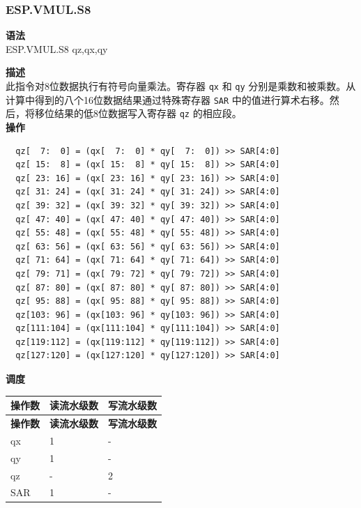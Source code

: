\newpage
\subsubsection{ESP.VMUL.S8}\label{instruction:ESPVMULS8}
\textbf{语法}\\
ESP.VMUL.S8 qz,qx,qy

\textbf{描述}\\
此指令对8位数据执行有符号向量乘法。寄存器 \lstinline{qx} 和 \lstinline{qy} 分别是乘数和被乘数。从计算中得到的八个16位数据结果通过特殊寄存器 \lstinline{SAR} 中的值进行算术右移。然后，将移位结果的低8位数据写入寄存器 \lstinline{qz} 的相应段。\\
\textbf{操作}
\begin{lstlisting}
  qz[  7:  0] = (qx[  7:  0] * qy[  7:  0]) >> SAR[4:0]
  qz[ 15:  8] = (qx[ 15:  8] * qy[ 15:  8]) >> SAR[4:0]
  qz[ 23: 16] = (qx[ 23: 16] * qy[ 23: 16]) >> SAR[4:0]
  qz[ 31: 24] = (qx[ 31: 24] * qy[ 31: 24]) >> SAR[4:0]
  qz[ 39: 32] = (qx[ 39: 32] * qy[ 39: 32]) >> SAR[4:0]
  qz[ 47: 40] = (qx[ 47: 40] * qy[ 47: 40]) >> SAR[4:0]
  qz[ 55: 48] = (qx[ 55: 48] * qy[ 55: 48]) >> SAR[4:0]
  qz[ 63: 56] = (qx[ 63: 56] * qy[ 63: 56]) >> SAR[4:0]
  qz[ 71: 64] = (qx[ 71: 64] * qy[ 71: 64]) >> SAR[4:0]
  qz[ 79: 71] = (qx[ 79: 72] * qy[ 79: 72]) >> SAR[4:0]
  qz[ 87: 80] = (qx[ 87: 80] * qy[ 87: 80]) >> SAR[4:0]
  qz[ 95: 88] = (qx[ 95: 88] * qy[ 95: 88]) >> SAR[4:0]
  qz[103: 96] = (qx[103: 96] * qy[103: 96]) >> SAR[4:0]
  qz[111:104] = (qx[111:104] * qy[111:104]) >> SAR[4:0]
  qz[119:112] = (qx[119:112] * qy[119:112]) >> SAR[4:0]
  qz[127:120] = (qx[127:120] * qy[127:120]) >> SAR[4:0]

\end{lstlisting}


\textbf{调度}\\
\begin{longtable}[c]{|l|l|l|}
    \hline
    \rowcolor{lightgray}
    \textbf{操作数} & \textbf{读流水级数} & \textbf{写流水级数} \\\hline
    \endfirsthead
    \hline
    \rowcolor{lightgray}
     \textbf{操作数} & \textbf{读流水级数} & \textbf{写流水级数} \\\hline
    \endhead
    \hline
    \endfoot

    qx & 1 & - \\\hline
  qy & 1 & - \\\hline
     qz & - & 2 \\\hline
    SAR & 1 & -

\end{longtable}

